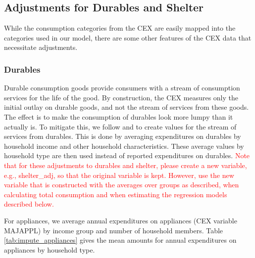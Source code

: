 \documentclass[article,11pt,letterpaper,fleqn]{article}
\theoremstyle{definition}
\numberwithin{equation}{section}
\newcommand{\cn}{\citeasnoun} %
\begin{document}
\subsection{Adjustments for Durables and Shelter}

While the consumption categories from the CEX are easily mapped into the categories used in our model, there are some other features of the CEX data that necessitate adjustments.  

\subsubsection{Durables}

Durable consumption goods provide consumers with a stream of consumption services for the life of the good.  By construction, the CEX measures only the initial outlay on durable goods, and not the stream of services from these goods.  The effect is to make the consumption of durables look more lumpy than it actually is.  To mitigate this, we follow \cn{King1979} and \cn{FR1993} to create values for the stream of services from durables.  This is done by averaging expenditures on durables by household income and other household characteristics.  These average values by household type are then used instead of reported expenditures on durables.  \textcolor{red}{Note that for these adjustments to durables and shelter, please create a new variable, e.g., shelter\_adj, so that the original variable is kept.  However, use the new variable that is constructed with the averages over groups as described, when calculating total consumption and when estimating the regression models described below.}

For appliances, we average annual expenditures on appliances (CEX variable MAJAPPL) by income group and number of household members.  Table \ref{tab:impute_appliances} gives the mean amounts for annual expenditures on appliances by household type.
\end{document}
